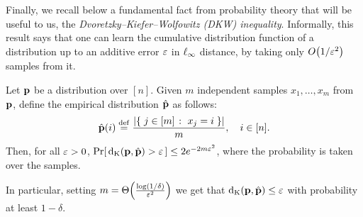 Finally, we recall below a fundamental fact from probability theory that will be useful to us, the \emph{Dvoretzky--Kiefer--Wolfowitz (DKW) inequality}. Informally, this result says that one can learn the cumulative distribution function of a distribution up to an additive error $\eps$ in $\lp[\infty]$ distance, by taking only $\bigO{1/\eps^2}$ samples from it.
\begin{theorem}\label{theo:dkw}
Let $\D$ be a distribution over $[n]$. Given $m$ independent samples $x_1,\dots ,x_m$ from $\D$, define the empirical distribution $\hat{\D}$ as follows:
\[
\hat{\D}(i) \eqdef \frac{\abs{ \setOfSuchThat{j\in[m]}{x_j=i} } }{m}, \quad i\in[n].
\]
Then, for all $\eps > 0$, $\probaOf{ \kolmogorov{\D}{\hat{\D}} > \eps } \leq 2e^{-2m\eps^2}$, where the probability is taken over the samples.
\end{theorem} 
\noindent In particular, setting $m=\bigTheta{\frac{\log(1/\delta)}{\eps^2}}$ we get that $\kolmogorov{\D}{\hat{\D}} \leq \eps$ with probability at least $1-\delta$.


